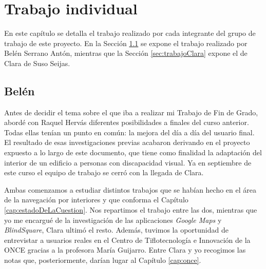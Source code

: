 \chapter{Trabajo individual}
\label{cap:trabajoIndiv}

En este capítulo se detalla el trabajo realizado por cada integrante del grupo de trabajo de este proyecto. En la Sección \ref{sec:trabajoBelen} se expone el trabajo realizado por Belén Serrano Antón, mientras que la Sección \ref{sec:trabajoClara} expone el de Clara de Suso Seijas.

\section{Belén}
\label{sec:trabajoBelen}

Antes de decidir el tema sobre el que iba a realizar mi Trabajo de Fin de Grado, abordé con Raquel Hervás diferentes posibilidades a finales del curso anterior. Todas ellas tenían un punto en común: la mejora del día a día del usuario final. El resultado de esas investigaciones previas acabaron derivando en el proyecto expuesto a lo largo de este documento, que tiene como finalidad la adaptación del interior de un edificio a personas con discapacidad visual. Ya en septiembre de este curso el equipo de trabajo se cerró con la llegada de Clara.

Ambas comenzamos a estudiar distintos trabajos que se habían hecho en el área de la navegación por interiores y que conforma el Capítulo \ref{cap:estadoDeLaCuestion}. Nos repartimos el trabajo entre las dos, mientras que yo me encargué de la investigación de las aplicaciones \textit{Google Maps} y \textit{BlindSquare}, Clara ultimó el resto. Además, tuvimos la oportunidad de entrevistar a usuarios reales en el Centro de Tiflotecnología e Innovación de la ONCE gracias a la profesora María Guijarro. Entre Clara y yo recogimos las notas que, posteriormente, darían lugar al Capítulo \ref{cap:once}.


